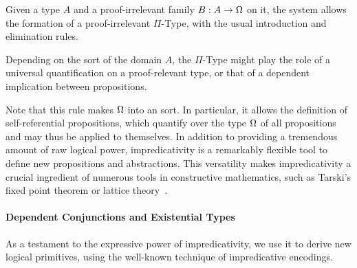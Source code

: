 Given a type \( A \) and a proof-irrelevant family \( B : A \to \Omega \)
on it, the system allows the formation of a proof-irrelevant \( \Pi \)-Type, 
with the usual introduction and elimination rules.
% 
% 
Depending on the sort of the domain \( A \), the \( \Pi \)-Type might play 
the role of a universal quantification on a proof-relevant type, or that of 
a dependent implication between propositions.

Note that this rule makes \( \Omega \) into an 
sort.
% 
In particular, it allows the definition of self-referential propositions,
which quantify over the type \( \Omega \) of all propositions and may thus
be applied to themselves.
%
In addition to providing a tremendous amount of raw logical power, 
impredicativity is a remarkably flexible tool to define new propositions and
abstractions.
% 
This versatility makes impredicativity a crucial ingredient of numerous 
tools in constructive mathematics, such as Tarski's fixed point theorem or 
lattice theory~.

\paragraph*{Dependent Conjunctions and Existential Types}
% 
As a testament to the expressive power of impredicativity, we use it to 
derive new logical primitives, using the well-known technique of impredicative 
encodings.

